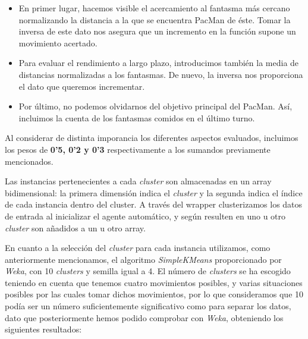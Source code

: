 \documentclass[12pt]{article}
\begin{document}
\begin{itemize}
    \item En primer lugar, hacemos visible el acercamiento al fantasma más cercano normalizando la distancia a la que se encuentra PacMan de éste. Tomar la inversa de este dato nos asegura que un incremento en la función supone un movimiento acertado.
    \item Para evaluar el rendimiento a largo plazo, introducimos también la media de distancias normalizadas a los fantasmas. De nuevo, la inversa nos proporciona el dato que queremos incrementar.
    \item Por último, no podemos olvidarnos del objetivo principal del PacMan. Así, incluimos la cuenta de los fantasmas comidos en el último turno.
\end{itemize}

Al considerar de distinta imporancia los diferentes aspectos evaluados, incluimos los pesos de \textbf{0'5, 0'2 y 0'3} respectivamente a los sumandos previamente mencionados.


Las instancias pertenecientes a cada \textit{cluster} son almacenadas en un array bidimensional: la primera dimensión indica el \textit{cluster} y la segunda indica el índice de cada instancia dentro del cluster. A través del wrapper clusterizamos los datos de entrada al inicializar el agente automático, y según resulten en uno u otro \textit{cluster} son añadidos a un u otro array.


En cuanto a la selección del \textit{cluster} para cada instancia utilizamos, como anteriormente mencionamos, el algoritmo \textit{SimpleKMeans} proporcionado por \textit{Weka}, con 10 \textit{clusters} y semilla igual a 4. El número de \textit{clusters} se ha escogido teniendo en cuenta que tenemos cuatro movimientos posibles, y varias situaciones posibles por las cuales tomar dichos movimientos, por lo que consideramos que 10 podía ser un número suficientemente significativo como para separar los datos, dato que posteriormente hemos podido comprobar con \textit{Weka}, obteniendo los siguientes resultados:
\end{document}
